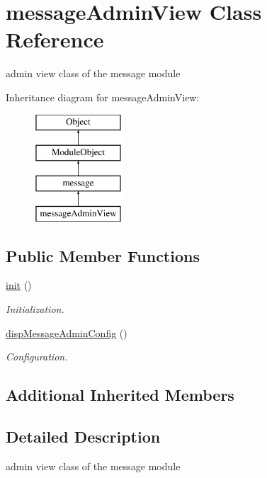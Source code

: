 \hypertarget{classmessageAdminView}{}\section{message\+Admin\+View Class Reference}
\label{classmessageAdminView}


admin view class of the message module  


Inheritance diagram for message\+Admin\+View\+:\begin{figure}[H]
\begin{center}
\leavevmode
\includegraphics[height=4.000000cm]{classmessageAdminView}
\end{center}
\end{figure}
\subsection*{Public Member Functions}
\begin{DoxyCompactItemize}
\item 
\hyperlink{classmessageAdminView_acfd2740e92846bc6d2be0433a73fcf9c}{init} ()
\begin{DoxyCompactList}\small\item\em Initialization. \end{DoxyCompactList}\item 
\hyperlink{classmessageAdminView_a20b39513c151ef7ed99f72a4b219533c}{disp\+Message\+Admin\+Config} ()
\begin{DoxyCompactList}\small\item\em Configuration. \end{DoxyCompactList}\end{DoxyCompactItemize}
\subsection*{Additional Inherited Members}


\subsection{Detailed Description}
admin view class of the message module 

